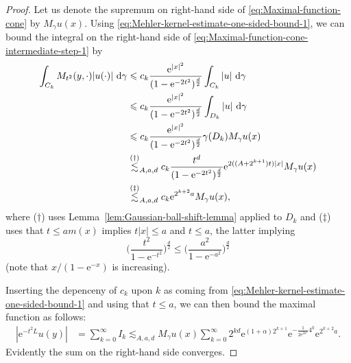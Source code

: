 \documentclass{amsart}
\theoremstyle{remark}
\newcommand{\D}{\,\textup{d}}
\renewcommand{\leq}{\leqslant}
\renewcommand{\leq}{\leqslant}
\newcommand{\e}{\mathrm{e}} %
\renewcommand{\leq}{\leqslant}%
\begin{document}
\begin{proof}
  Let us denote the supremum on right-hand side of
  \eqref{eq:Maximal-function-cone} by $M_\gamma u (x)$. Using
  \eqref{eq:Mehler-kernel-estimate-one-sided-bound-1}, we can bound the
  integral on the right-hand side of
  \eqref{eq:Maximal-function-cone-intermediate-step-1} by
  \begin{align*}
    \int_{C_k}  M_{t^2}(y, \cdot) |u(\cdot)| \,\D\gamma & \leq
    c_k \frac{\e^{|x|^2}}{(1 - \e^{-2t^2})^{\frac{d}2}}   \int_{C_k}
    |u| \,\D\gamma\\ 
    &\leq c_k \frac {\e^{|x|^2}} {(1 -
      \e^{-2t^2})^{\frac{d}2}} \int_{D_k} |u| \,\D\gamma\\ 
    &\leq c_k  \frac {\e^{|x|^2}}{(1 - \e^{-2t^2})^{\frac{d}2}}  \gamma(D_k) M_\gamma u(x)\\
    &\overset{(\dagger)}{\lesssim}_{A,a,d} c_k 
    \frac {t^d}{(1 - \e^{-2t^2})^{\frac{d}2}} \e^{2((A +2^{k + 1})t)|x|} M_\gamma u(x)\\
    &\overset{(\ddagger)}{\lesssim}_{A,a,d} c_k \e^{2^{k + 2} a} M_\gamma u(x),
  \end{align*}
  where ($\dagger$) uses Lemma~\ref{lem:Gaussian-ball-shift-lemma} applied to
  $D_k$ and ($\ddagger$) uses that $t \leq am(x)$ implies $t|x|\leq a$
  and $t\leq a$, the latter implying
  \begin{equation*}
    \biggl(\frac{t^2}{1 -
      \e^{-t^2}} \biggr)^{\frac{d}2} \leq
    \biggl(\frac{a^2}{1 -
      \e^{-a^2}} \biggr)^{\frac{d}2}
  \end{equation*}
  (note that $x/(1-\e^{-x})$ is increasing).

  Inserting the depenceny of $c_k$ upon $k$ as coming from 
  \eqref{eq:Mehler-kernel-estimate-one-sided-bound-1} and using that $t\leq a$, 
  we can then bound the maximal function as follows: 
  \begin{align*}
    |\e^{-t^2 L} u(y)| &= \sum_{k = 0}^\infty I_k
    \lesssim_{A,a,d} M_\gamma u(x) \sum_{k = 0}^\infty 2^{kd} \e^{(1+\alpha) 2^{k + 1}} 
    \e^{-\frac1{2 \e^{2a^2}}  4^k} \e^{ 2^{k + 2} a}.
  \end{align*}
  Evidently the sum on the right-hand side converges.
\end{proof}


\end{document}
